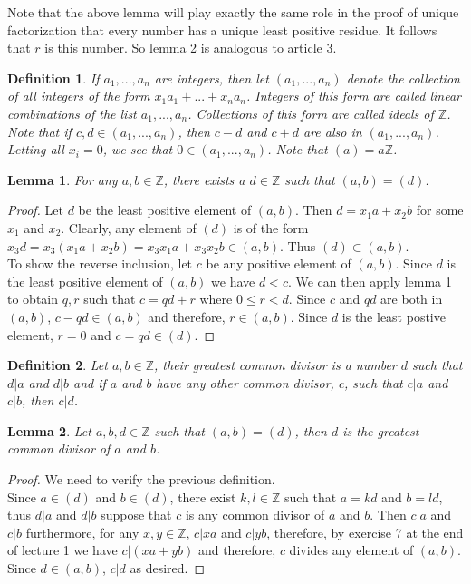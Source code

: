 \documentclass{article}
\theoremstyle{problemstyle}
\newtheorem{lemma}{Lemma}
\newtheorem{definition}{Definition}
\begin{document}
Note that the above lemma will play exactly the same role in the proof of unique factorization that every number has a unique least positive residue. It follows that $r$ is this number. So lemma 2 is analogous to article 3. 

\begin{definition}
If $a_1,...,a_n$ are integers, then let $(a_1,...,a_n)$ denote the collection of all integers of the form $x_1a_1+...+x_na_n$. Integers of this form are called linear combinations of the list $a_1,...,a_n$. Collections of this form are called ideals of $\mathbb{Z}$. Note that if $c,d \in (a_1,...,a_n)$, then $c-d$ and $c+d$ are also in $(a_1,...,a_n)$. Letting all $x_i = 0$, we see that $0 \in (a_1,...,a_n)$. Note that $(a) = a\mathbb{Z}$. 
\end{definition}

\begin{lemma}
For any $a,b \in \mathbb{Z}$, there exists a $d \in \mathbb{Z}$ such that $(a,b) = (d)$. 
\end{lemma}

\begin{proof}
Let $d$ be the least positive element of $(a,b)$. Then $d = x_1a + x_2b$ for some $x_1$ and $x_2$. Clearly, any element of $(d)$ is of the form $x_3d = x_3(x_1a + x_2b) = x_3x_1a + x_3x_2b \in (a,b)$. Thus $(d) \subset (a,b)$.\\

To show the reverse inclusion, let $c$ be any positive element of $(a,b)$.  Since $d$ is the least positive element of $(a,b)$ we have $d < c$. We can then apply lemma 1 to obtain $q, r$ such that $c = qd + r$ where $0 \leq r < d$. Since $c$ and $qd$ are both in $(a,b)$, $c-qd \in (a,b)$ and therefore, $r \in (a,b)$. Since $d$ is the least postive element, $r = 0$ and $c = qd \in (d)$.  
\end{proof}

\begin{definition}
Let $a,b \in \mathbb{Z}$, their greatest common divisor is a number $d$ such that $d|a$ and $d|b$ and if $a$ and $b$ have any other common divisor, $c$, such that $c|a$ and $c|b$, then $c|d$.  
\end{definition}

\begin{lemma}
Let $a,b,d \in \mathbb{Z}$ such that $(a,b) = (d)$, then $d$ is the greatest common divisor of $a$ and $b$.   
\end{lemma}

\begin{proof}
We need to verify the previous definition. \\

Since $a \in (d)$ and $b \in (d)$, there exist $k,l \in \mathbb{Z}$ such that $a = kd$ and $b = ld$, thus $d|a$ and $d|b$ suppose that $c$ is any common divisor of $a$ and $b$. Then $c|a$ and $c|b$ furthermore, for any $x,y \in \mathbb{Z}$, $c|xa$ and $c|yb$, therefore, by exercise 7 at the end of lecture 1 we have $c|(xa+yb)$ and therefore, $c$ divides any element of $(a,b)$. Since $d \in (a,b)$, $c|d$ as desired. 
\end{proof}
\end{document}
